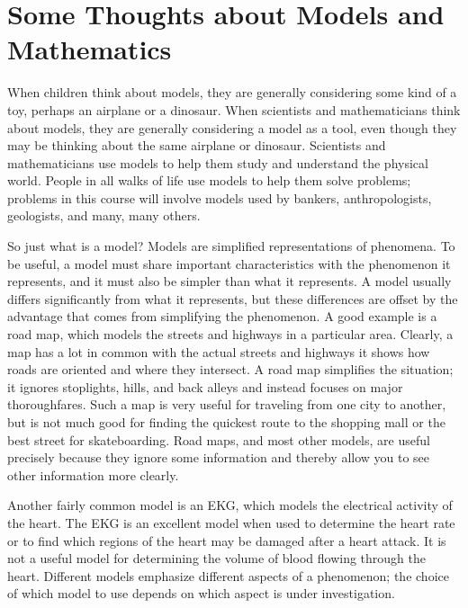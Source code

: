 \documentclass[10pt,]{book}
\theoremstyle{ptxdefinitionnotitle}
\theoremstyle{ptxdefinitiontitle}
\numberwithin{equation}{section}
\begin{document}
\section[{Some Thoughts about Models and Mathematics}]{Some Thoughts about Models and Mathematics}\label{chapter01-section01}
\hypertarget{p-4}{}%
When children think about models, they are generally considering some kind of a toy, perhaps an airplane or a dinosaur. When scientists and mathematicians think about models, they are generally considering a model as a tool, even though they may be thinking about the same airplane or dinosaur. Scientists and mathematicians use models to help them study and understand the physical world. People in all walks of life use models to help them solve problems; problems in this course will involve models used by bankers, anthropologists, geologists, and many, many others.%
\par
\hypertarget{p-5}{}%
So just what is a model? Models are simplified representations of phenomena. To be useful, a model must share important characteristics with the phenomenon it represents, and it must also be simpler than what it represents. A model usually differs significantly from what it represents, but these differences are offset by the advantage that comes from simplifying the phenomenon. A good example is a road map, which models the streets and highways in a particular area. Clearly, a map has a lot in common with the actual streets and highways it shows how roads are oriented and where they intersect. A road map simplifies the situation; it ignores stoplights, hills, and back alleys and instead focuses on major thoroughfares. Such a map is very useful for traveling from one city to another, but is not much good for finding the quickest route to the shopping mall or the best street for skateboarding. Road maps, and most other models, are useful precisely because they ignore some information and thereby allow you to see other information more clearly.%
\par
\hypertarget{p-6}{}%
Another fairly common model is an EKG, which models the electrical activity of the heart. The EKG is an excellent model when used to determine the heart rate or to find which regions of the heart may be damaged after a heart attack. It is not a useful model for determining the volume of blood flowing through the heart. Different models emphasize different aspects of a phenomenon; the choice of which model to use depends on which aspect is under investigation.%
\par
\hypertarget{p-7}{}%
\end{document}
